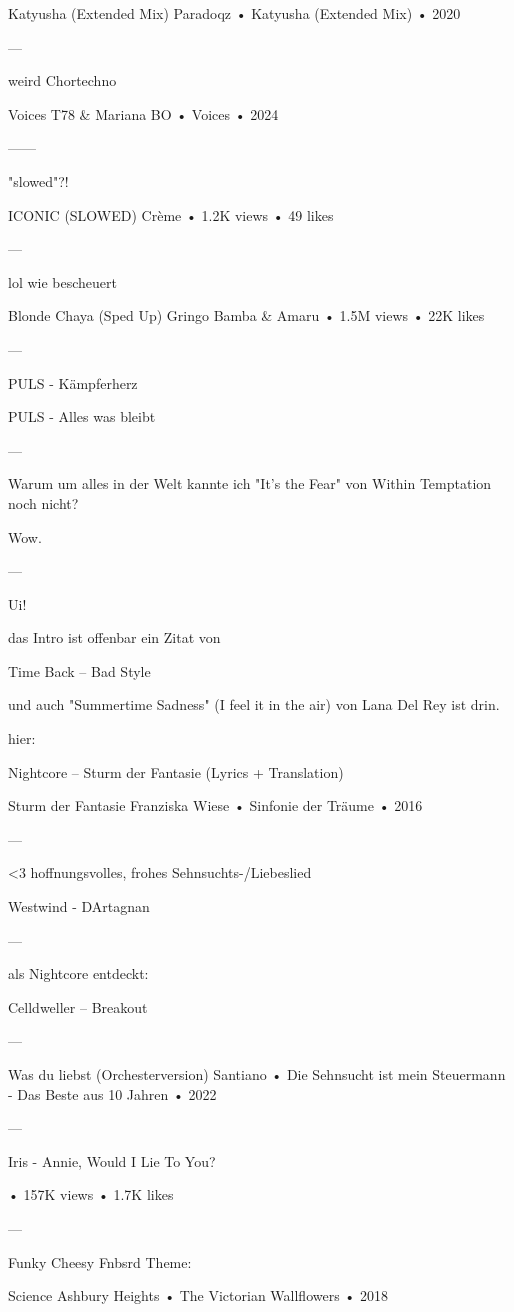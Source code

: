 Katyusha (Extended Mix)
Paradoqz
 •
Katyusha (Extended Mix)
 • 2020

—

weird Chortechno

Voices
T78
 &
Mariana BO
 •
Voices
 • 2024

——


"slowed"?!

ICONIC (SLOWED)
Crème
 •
1.2K views
 •
49 likes


—

lol wie bescheuert

Blonde Chaya (Sped Up)
Gringo Bamba
 &
Amaru
 •
1.5M views
 •
22K likes


—


PULS - Kämpferherz

PULS - Alles was bleibt

—

Warum um alles in der Welt kannte ich "It's the Fear" von Within Temptation noch nicht?

Wow.

—

Ui!

das Intro ist offenbar ein Zitat von

Time Back – Bad Style

und auch "Summertime Sadness" (I feel it in the air) von Lana Del Rey ist drin.

hier:

Nightcore – Sturm der Fantasie (Lyrics + Translation)

Sturm der Fantasie
Franziska Wiese
 •
Sinfonie der Träume
 •
2016


—

<3 hoffnungsvolles, frohes Sehnsuchts-/Liebeslied

Westwind - DArtagnan

—

als Nightcore entdeckt:

Celldweller – Breakout

—

Was du liebst (Orchesterversion)
Santiano
 •
Die Sehnsucht ist mein Steuermann - Das Beste aus 10 Jahren
 •
2022

—

Iris - Annie, Would I Lie To You?

 •
157K views
 •
1.7K likes


—

Funky Cheesy Fnbsrd Theme:

Science
Ashbury Heights
 •
The Victorian Wallflowers
 •
2018



